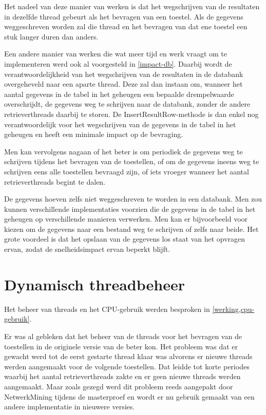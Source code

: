 Het nadeel van deze manier van werken is dat het wegschrijven van de resultaten in dezelfde thread gebeurt als het bevragen van een toestel.
Als de gegevens weggeschreven worden zal die thread en het bevragen van dat ene toestel een stuk langer duren dan anders.

Een andere manier van werken die wat meer tijd en werk vraagt om te implementeren werd ook al voorgesteld in \cref{impact-db}.
Daarbij wordt de verantwoordelijkheid van het wegschrijven van de resultaten in de databank overgeheveld naar een aparte thread.
Deze zal dan instaan om, wanneer het aantal gegevens in de tabel in het geheugen een bepaalde drempelwaarde overschrijdt,
de gegevens weg te schrijven naar de databank, zonder de andere retrieverthreads daarbij te storen.
De InsertResultRow-methode is dan enkel nog verantwoordelijk voor het wegschrijven van de gegevens in de tabel in het geheugen en heeft een minimale impact op de bevraging.

Men kan vervolgens nagaan of het beter is om periodiek de gegevens weg te schrijven tijdens het bevragen van de toestellen,
of om de gegevens ineens weg te schrijven eens alle toestellen bevraagd zijn, of iets vroeger wanneer het aantal retrieverthreads begint te dalen.

De gegevens hoeven zelfs niet weggeschreven te worden in een databank.
Men zou kunnen verschillende implementaties voorzien die de gegevens in de tabel in het geheugen op verschillende manieren verwerken.
Men kan er bijvoorbeeld voor kiezen om de gegevens naar een bestand weg te schrijven of zelfs naar beide.
Het grote voordeel is dat het opslaan van de gegevens los staat van het opvragen ervan, zodat de snelheidsimpact ervan beperkt blijft.


\section{Dynamisch threadbeheer}

Het beheer van threads en het CPU-gebruik werden besproken in \cref{werking,cpu-gebruik}.

Er was al gebleken dat het beheer van de threads voor het bevragen van de toestellen in de originele versie van de \nwmretriever{} beter kon.
Het probleem was dat er gewacht werd tot de eerst gestarte thread klaar was alvorens er nieuwe threads werden aangemaakt voor de volgende toestellen.
Dat leidde tot korte periodes waarbij het aantal retrieverthreads zakte en er geen nieuwe threads werden aangemaakt.
Maar zoals gezegd werd dit probleem reeds aangepakt door NetwerkMining tijdens de masterproef en
wordt er nu gebruik gemaakt van een andere implementatie in nieuwere versies.

